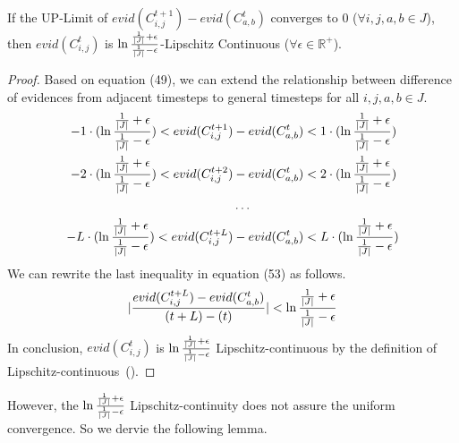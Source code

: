 \begin{lemma}
\label{lem:adj_lip_continuous}
If the UP-Limit of $evid(C^{t+1}_{i,j})-evid(C^t_{a,b})$ converges to 0 ($\forall i,j,a,b \in J$),
then $evid(C^t_{i,j})$ is $\ln{{1 \over |J|}+\epsilon \over {1 \over |J|}-\epsilon}$-Lipschitz Continuous
($\forall \epsilon \in \mathbb{R}^+$).
\end{lemma}
\begin{proof}
Based on equation (49), we can extend the relationship between difference of evidences from adjacent timesteps to general timesteps
for all $i,j,a,b \in J$.  
\begin{align}
    \begin{split}
        -1\cdot(\ln{{1 \over |J|}+\epsilon \over {1 \over |J|}-\epsilon}) 
        < evid(C^{t+1}_{i,j}) &- evid(C^{t}_{a,b}) < 1\cdot(\ln{{1 \over |J|} + \epsilon \over {1 \over |J|}-\epsilon})\\
        -2\cdot(\ln{{1 \over |J|}+\epsilon \over {1 \over |J|}-\epsilon}) 
        < evid(C^{t+2}_{i,j}) &- evid(C^{t}_{a,b}) < 2\cdot(\ln{{1 \over |J|} + \epsilon \over {1 \over |J|}-\epsilon})\\
                              &\dots\\
        -L\cdot(\ln{{1 \over |J|}+\epsilon \over {1 \over |J|}-\epsilon}) 
        < evid(C^{t+L}_{i,j}) &- evid(C^{t}_{a,b}) < L\cdot(\ln{{1 \over |J|} + \epsilon \over {1 \over |J|}-\epsilon})\\        
    \end{split}
\end{align}
We can rewrite the last inequality in equation (53) as follows. 
\begin{align}
    |{evid(C^{t+L}_{i,j}) - evid(C^t_{a,b}) \over (t+L) - (t)}| < \ln {{1 \over |J|} +\epsilon \over {1 \over |J|} - \epsilon}
\end{align}
In conclusion, $evid(C^{t}_{i,j})$ is $\ln{{1 \over |J|}+\epsilon \over {1 \over |J|}-\epsilon}$ Lipschitz-continuous 
by the definition of Lipschitz-continuous~(\cite{KavoshDM18}).  
\end{proof}

However, the $\ln{{1 \over |J|}+\epsilon \over {1 \over |J|}-\epsilon}$ Lipschitz-continuity does not assure the uniform convergence. 
So we dervie the following lemma.

